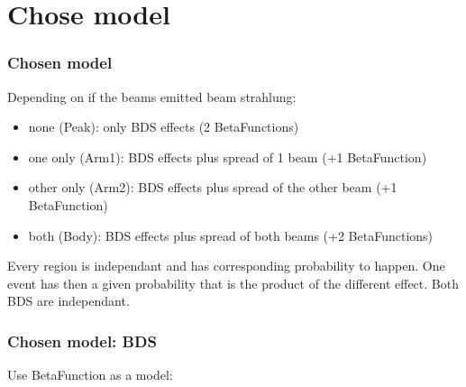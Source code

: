 \documentclass{beamer}
\begin{document}
\section{Chose model}
\begin{frame}
\frametitle{Chosen model}
Depending on if the beams emitted beam strahlung: 
\begin{itemize}
  \item none (Peak): only BDS effects (2 BetaFunctions)
  \item one only (Arm1): BDS effects plus spread of 1 beam (+1 BetaFunction)
  \item other only (Arm2): BDS effects plus spread of the other beam (+1
  BetaFunction)
  \item both (Body): BDS effects plus spread of both beams (+2 BetaFunctions)
\end{itemize}
Every region is independant and has corresponding probability to happen. One
event has then a given probability that is the product of the different effect.
Both BDS are independant.
\end{frame}

\begin{frame}
\frametitle{Chosen model: BDS}
Use BetaFunction as a model:\\
\end{frame}
\end{document}
